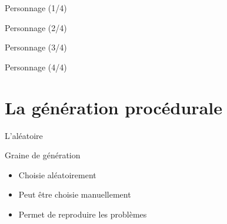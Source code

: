 \documentclass{beamer}
\begin{document}
{\begin{frame}{Personnage (1/4)}
\end{frame}

\begin{frame}{Personnage (2/4)}

\end{frame}

\begin{frame}{Personnage (3/4)}

\end{frame}

\begin{frame}{Personnage (4/4)}

\end{frame}

\section{La génération procédurale}
\begin{frame}{L'al\'eatoire}
    \begin{block}{Graine de génération}
        \begin{itemize}
            \item[\bullet] Choisie aléatoirement
            \item[\bullet] Peut être choisie manuellement
            \item[\bullet] Permet de reproduire les problèmes
        \end{itemize}
    \end{block}
\end{frame}

}
\end{document}
